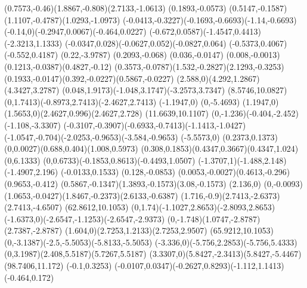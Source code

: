 {    \rcurveto(0.7573,-0.46)(1.8867,-0.808)(2.7133,-1.0613)
    \rlineto(0.1893,-0.0573)
    \rcurveto(0.5147,-0.1587)(1.1107,-0.4787)(1.0293,-1.0973)
    \rcurveto(-0.0413,-0.3227)(-0.1693,-0.6693)(-1.14,-0.6693)
    \rcurveto(-0.14,0)(-0.2947,0.0067)(-0.464,0.0227)
    \rcurveto(-0.672,0.0587)(-1.4547,0.4413)(-2.3213,1.1333)
    \rcurveto(-0.0347,0.028)(-0.0627,0.052)(-0.0827,0.064)
    \rlineto(-0.5373,0.4067)
    \rlineto(-0.552,0.4187)
    \rlineto(0.22,-3.9787)
    \rlineto(0.2093,-0.068)
    \rlineto(0.036,-0.0147)
    \rcurveto(0.008,-0.0013)(0.1213,-0.0387)(0.4827,-0.12)
    \rcurveto(0.3573,-0.0787)(1.532,-0.2827)(2.1293,-0.3253)
    \rcurveto(0.1933,-0.0147)(0.392,-0.0227)(0.5867,-0.0227)
    \rcurveto(2.588,0)(4.292,1.2867)(4.3427,3.2787)
    \rcurveto(0.048,1.9173)(-1.048,3.1747)(-3.2573,3.7347)
    \moveto(8.5746,10.0827)%
    \rcurveto(0,1.7413)(-0.8973,2.7413)(-2.4627,2.7413)
    \rlineto(-1.1947,0)
    \rlineto(0,-5.4693)
    \rlineto(1.1947,0)
    \rcurveto(1.5653,0)(2.4627,0.996)(2.4627,2.728)
    \moveto(11.6639,10.1107)%
    \rcurveto(0,-1.236)(-0.404,-2.452)(-1.108,-3.3307)
    \rcurveto(-0.3107,-0.3907)(-0.6933,-0.7413)(-1.1413,-1.0427)
    \rcurveto(-1.0547,-0.704)(-2.0253,-0.9653)(-3.584,-0.9653)
    \rlineto(-5.5573,0)
    \rlineto(0.2373,0.1373)
    \rcurveto(0,0.0027)(0.688,0.404)(1.008,0.5973)
    \rcurveto(0.308,0.1853)(0.4347,0.3667)(0.4347,1.024)
    \rlineto(0,6.1333)
    \rcurveto(0,0.6733)(-0.1853,0.8613)(-0.4493,1.0507)
    \rcurveto(-1.3707,1)(-1.488,2.148)(-1.4907,2.196)
    \rlineto(-0.0133,0.1533)
    \rlineto(0.128,-0.0853)
    \rcurveto(0.0053,-0.0027)(0.4613,-0.296)(0.9653,-0.412)
    \rcurveto(0.5867,-0.1347)(1.3893,-0.1573)(3.08,-0.1573)
    \rlineto(2.136,0)
    \rlineto(0,-0.0093)
    \rcurveto(1.0653,-0.0427)(1.8467,-0.2373)(2.6133,-0.6387)
    \rcurveto(1.716,-0.9)(2.7413,-2.6373)(2.7413,-4.6507)
    \moveto(62.8612,10.1053)%
    \rcurveto(0,1.74)(-1.1027,2.8653)(-2.8093,2.8653)
    \rcurveto(-1.6373,0)(-2.6547,-1.1253)(-2.6547,-2.9373)
    \rcurveto(0,-1.748)(1.0747,-2.8787)(2.7387,-2.8787)
    \rcurveto(1.604,0)(2.7253,1.2133)(2.7253,2.9507)
    \moveto(65.9212,10.1053)%
    \rcurveto(0,-3.1387)(-2.5,-5.5053)(-5.8133,-5.5053)
    \rcurveto(-3.336,0)(-5.756,2.2853)(-5.756,5.4333)
    \rcurveto(0,3.1987)(2.408,5.5187)(5.7267,5.5187)
    \rcurveto(3.3307,0)(5.8427,-2.3413)(5.8427,-5.4467)
    \moveto(98.7406,11.172)%
    \rlineto(-0.1,0.3253)
    \rcurveto(-0.0107,0.0347)(-0.2627,0.8293)(-1.112,1.1413)
    \rlineto(-0.464,0.172)
}
